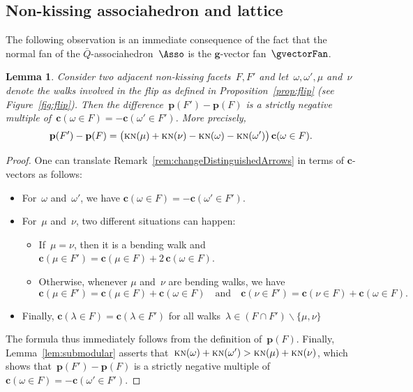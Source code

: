 \documentclass{amsart}
\newtheorem{lemma}[theorem]{Lemma}
\theoremstyle{definition}
\renewcommand{\b}[1]{\mathbf{#1}} %
\newcommand{\ssm}{\smallsetminus} %
\newcommand{\fref}[1]{Figure~\ref{#1}} %
\newcommand{\KN}{\textsc{kn}} %
\newcommand{\cvector}[2]{\mathbf{c}(#1 \in #2)} %
\newcommand{\point}[1]{\mathbf{p}(#1)} %
\begin{document}
\subsection{Non-kissing associahedron and lattice}
\label{subsec:geomLattice}

The following observation is an immediate consequence of the fact that the normal fan of the $\bar Q$-associahedron~$\Asso$ is the $\b{g}$-vector fan~$\gvectorFan$.

\begin{lemma}
Consider two adjacent non-kissing facets~$F,F'$ and let~$\omega, \omega', \mu$ and~$\nu$ denote the walks involved in the flip as defined in Proposition~\ref{prop:flip} (see \fref{fig:flip}).
Then the difference~${\point{F'} - \point{F}}$ is a strictly negative multiple of~$\cvector{\omega}{F} = -\cvector{\omega'}{F'}$.
More precisely,
\[
\point{F'} - \point{F} = \big( \KN(\mu) + \KN(\nu) - \KN(\omega) - \KN(\omega') \big) \, \cvector{\omega}{F}.
\]
\end{lemma}

\begin{proof}
One can translate Remark~\ref{rem:changeDistinguishedArrows} in terms of $\b{c}$-vectors as follows:
\begin{itemize}
\item For~$\omega$ and~$\omega'$, we have $\cvector{\omega}{F} = -\cvector{\omega'}{F'}$.
\item For~$\mu$ and~$\nu$, two different situations can happen:
\begin{itemize}
\item If~$\mu = \nu$, then it is a bending walk and~$\cvector{\mu}{F'} = \cvector{\mu}{F} + 2\,\cvector{\omega}{F}$.
\item Otherwise, whenever $\mu$ and~$\nu$ are bending walks, we have
\[
\cvector{\mu}{F'} = \cvector{\mu}{F} + \cvector{\omega}{F}
\quad\text{and}\quad
\cvector{\nu}{F'} = \cvector{\nu}{F} + \cvector{\omega}{F}.
\]
\end{itemize}
\item Finally, $\cvector{\lambda}{F} = \cvector{\lambda}{F'}$ for all walks~$\lambda \in (F \cap F') \ssm \{\mu,\nu\}$
\end{itemize}
The formula thus immediately follows from the definition of~$\point{F}$.
Finally, Lemma~\ref{lem:submodular} asserts that~${\KN(\omega) + \KN(\omega') > \KN(\mu) + \KN(\nu)}$, which shows that~${\point{F'} - \point{F}}$ is a strictly negative multiple of~$\cvector{\omega}{F} = -\cvector{\omega'}{F'}$.
\end{proof}
\end{document}
